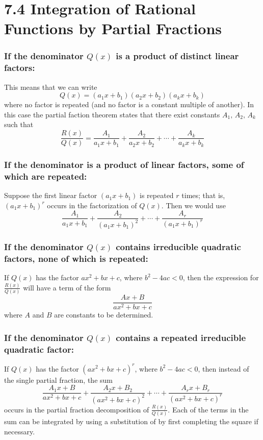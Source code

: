 %
%

\section*{7.4 Integration of Rational Functions by Partial Fractions}

\subsubsection*{If the denominator \(Q(x)\) is a product of distinct linear factors:}
This means that we can write
\[ Q(x) = (a_1 x + b_1)(a_2 x + b_2)(a_k x + b_k) \]
where no factor is repeated (and no factor is a constant multiple of another). In this case the partial faction theorem states that there exist constants \(A_1 \text{, } A_2 \text{, } A_k\) such that
\[ \frac{R(x)}{Q(x)} = \frac{A_1}{a_1 x + b_1} + \frac{A_2}{a_2 x + b_2} + \cdots + \frac{A_k}{a_k x + b_k} \]
\subsubsection*{If the denominator is a product of linear factors, some of which are repeated:}
Suppose the first linear factor \((a_1 x + b_1)\) is repeated \(r\) times; that is, \((a_1 x + b_1)^r\) occurs in the factorization of \(Q(x)\). Then we would use  
\[ \frac{A_1}{a_1 x + b_1} + \frac{A_2}{(a_1 x + b_1)^2} + \cdots + \frac{A_r}{(a_1 x + b_1)^r} \]
\subsubsection*{If the denominator \(Q(x)\) contains irreducible quadratic factors, none of which is repeated:}
If \(Q(x)\) has the factor \(ax^2 + bx + c\), where \(b^2 - 4ac < 0\), then the expression for \( \frac{R(x)}{Q(x)} \) will have a term of the form
\[ \frac{Ax+B}{ax^2 + bx + c} \] 
where \(A\) and \(B\) are constants to be determined.
\subsubsection*{If the denominator \(Q(x)\) contains a repeated irreducible quadratic factor:}
If \(Q(x)\) has the factor \((ax^2 + bx + c)^r\), where \(b^2 - 4ac < 0\), then instead of the single partial fraction, the sum
\[ \frac{A_1 x + B}{ax^2 + bx + c} + \frac{A_2x + B_2}{(ax^2 + bx + c)^2} + \cdots + \frac{A_r x + B_r}{(ax^2 + bx + c)^r} \]
occurs in the partial fraction decomposition of \(\frac{R(x)}{Q(x)}\). Each of the terms in the sum can be integrated by using a substitution of by first completing the square if necessary.
